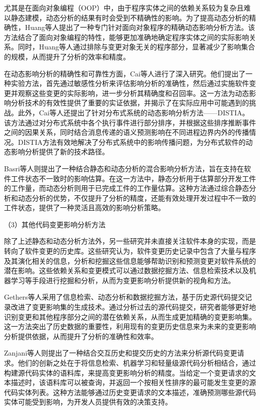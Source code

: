 尤其是在面向对象编程（OOP）中，由于程序实体之间的依赖关系较为复杂且难以静态建模，动态分析的结果有时会受到不精确性的影响。为了提高动态分析的精确性，Huang等人\cite{2007Precise}提出了一种专门针对面向对象程序的精确动态影响分析方法。该方法结合了面向对象编程的特性，能够更加准确地确定程序实体之间的实际影响关系。同时，Huang等人通过排除与变更对象无关的程序部分，显著减少了影响集合的规模，从而提升了分析的效率和精度。

在动态影响分析的精确性和可靠性方面，Cai等人\cite{2015Acom,2014Estimating}进行了深入研究。他们提出了一种实验方法，首先通过敏感性分析来评估影响分析的准确性，然后通过实施软件变更并观察这些变更的实际影响，进一步分析其精确度和召回率。这一方法为动态影响分析技术的有效性提供了重要的实证依据，并揭示了在实际应用中可能遇到的挑战。此外，Cai等人还提出了针对分布式系统的动态影响分析方法——DISTIA\cite{2016DistIA}。该方法通过对分布式系统中各个执行事件进行部分排序，并根据这些排序推断事件之间的因果关系，同时结合消息传递的语义预测影响在不同进程边界内外的传播情况。DISTIA方法有效地解决了分布式系统中的影响传播问题，为分布式软件的动态影响分析提供了新的技术路径。

Basri等人\cite{2016Using}则提出了一种结合静态和动态分析的混合影响分析方法，旨在支持在软件工件状态不一致时的影响估算。在这一方法中，静态分析用于估算部分开发工件的工作量，而动态分析则用于已完成工件的工作量估算。这种方法通过综合静态分析和动态分析的优势，不仅提升了分析的精度，还能有效处理开发过程中不一致的工件状态，提供了一种灵活且高效的影响分析策略。

（3）其他代码变更影响分析方法

除了上述静态和动态分析方法外，另一些研究并未直接关注软件本身的实现，而是转向了软件变更的历史库\cite{2011An, Markus2017Supporting, 2008Mining, 2014Impact, 2016Generalizing}。这些研究认为，软件变更历史记录中包含了大量与程序及其演化相关的信息，分析和挖掘这些信息能够帮助识别和预测变更对软件系统的潜在影响。这些依赖关系和变更模式可以通过数据挖掘方法、信息检索技术以及机器学习等手段进行挖掘和分析，从而为变更影响分析提供新的视角和方法。

Gethers等人\cite{2011An}采用了信息检索、动态分析和数据挖掘方法，基于历史源代码提交记录改进了变更影响集的生成技术。通过分析过去的源代码提交，研究者能够更好地识别变更和其他程序部分之间的潜在依赖关系，从而生成更加精确的变更影响集。这一方法突出了历史数据的重要性，利用现有的变更历史信息来为未来的变更影响分析提供依据，从而提升了分析的准确性和效率。

Zanjani等人\cite{2014Impact}则提出了一种结合交互历史和提交历史的方法来分析源代码变更请求。他们的创新之处在于将信息检索、机器学习和轻量级源代码分析相结合，通过构建源代码实体的语料库，来提高变更影响分析的精度。当给定一个变更请求的文本描述时，该语料库可以被查询，并返回一个按相关性排序的最可能发生变更的源代码实体列表。这种方法能够通过历史变更请求的文本描述，准确预测哪些源代码实体可能受到影响，为开发人员提供有效的决策支持。

